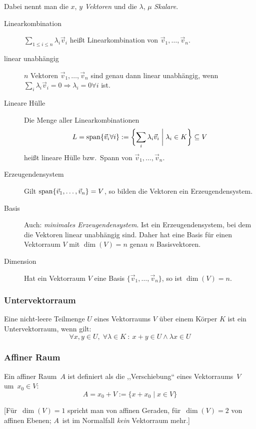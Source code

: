 Dabei nennt man die $x$, $y$ \emph{Vektoren} und die $\lambda$, $\mu$ \emph{Skalare}.
\begin{description}
  \item [Linearkombination]
        $\sum_{1 \leq i \leq n} \lambda_i \vec v_i$ heißt Linearkombination von $\vec v_1, \ldots, \vec v_n$.
  \item [linear unabhängig]
        $n$ Vektoren $\vec v_1, \ldots, \vec v_n$ sind genau dann linear unabhängig, wenn $\sum_i \lambda_i \vec v_i = 0 \Longrightarrow \lambda_i = 0 \forall i$ ist.
  \item [Lineare Hülle]
	Die Menge aller Linearkombinationen
	\[ L = \operatorname{span}\{\vec v_i \forall i\} := \biggl\{ \sum_i \lambda_i \vec v_i \biggm| \lambda_i \in K\biggr\} \subseteq V \]
	heißt lineare Hülle bzw.~Spann von $\vec{v}_{1},\ldots,\vec{v}_{n}$.
  \item [Erzeugendensystem]
	Gilt $\operatorname{span}\{\vec v_1,\ldots,\vec v_n\} = V$, so bilden die Vektoren ein Erzeugendensystem.
  \item [Basis]
	Auch: \emph{minimales Erzeugendensystem}.
	Ist ein Erzeugendensystem, bei dem die Vektoren linear unabhängig sind.
	Daher hat eine Basis für einen Vektorraum $V$ mit $\dim(V)=n$ genau $n$ Basisvektoren.
  \item [Dimension]
	Hat ein Vektorraum $V$ eine Basis $\{ \vec v_1,\ldots,\vec v_n\}$, so ist $\dim(V)=n$.
\end{description}

\subsubsection{Untervektorraum}

Eine nicht-leere Teilmenge $U$ eines Vektorraums $V$ über einem Körper $K$ ist ein Untervektorraum, wenn gilt:
\[ \forall x,y\in U,\; \forall\lambda\in K\ :\ x+y\in U\land\lambda x\in U \]

\subsubsection{Affiner Raum}

Ein affiner Raum~$A$ ist definiert als die ,,Verschiebung`` eines Vektorraums~$V$ um~$x_0 \in V$:
\[ A = x_0 + V := \{ x+x_0 \mid x \in V \} \]

[Für~$\dim(V)=1$ spricht man von affinen Geraden, für~$\dim(V)=2$ von affinen Ebenen; $A$~ist im Normalfall \emph{kein} Vektorraum mehr.]

